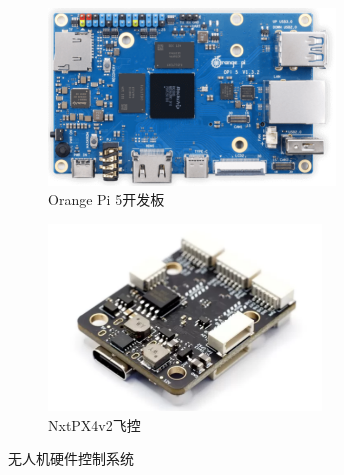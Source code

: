 \documentclass[lang=chs, degree=master, blindreview=false, winfonts=true]{yanputhesis}
\begin{document}
\begin{figure}[htb!]
    \centering
    \begin{minipage}[t]{0.96\textwidth}
        \centering
        \begin{subfigure}[t]{0.47\textwidth}
            \centering
            \includegraphics[height = 1.85in]{picture/5_5.png}
            \caption{Orange Pi 5开发板\label{fig.fmtpath}}
        \end{subfigure}\hfill
        \begin{subfigure}[t]{0.47\textwidth}
            \centering
            \includegraphics[height = 1.95in]{picture/5_6.png}
            \caption{NxtPX4v2飞控\label{fig.proximity-tra}}
        \end{subfigure}
    \end{minipage}
    \caption{无人机硬件控制系统}
\end{figure}

\end{document}
